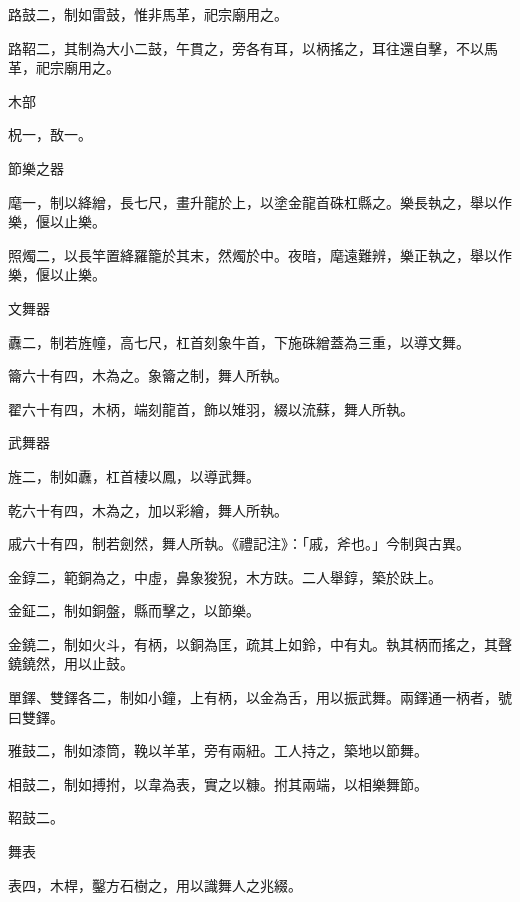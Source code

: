 \begin{pinyinscope}
 路鼓二，制如雷鼓，惟非馬革，祀宗廟用之。



 路鞀二，其制為大小二鼓，午貫之，旁各有耳，以柄搖之，耳往還自擊，不以馬革，祀宗廟用之。



 木部



 柷一，敔一。



 節樂之器



 麾一，制以絳繒，長七尺，畫升龍於上，以塗金龍首硃杠縣之。樂長執之，舉以作樂，偃以止樂。



 照燭二，以長竿置絳羅籠於其末，然燭於中。夜暗，麾遠難辨，樂正執之，舉以作樂，偃以止樂。



 文舞器



 纛二，制若旌幢，高七尺，杠首刻象牛首，下施硃繒蓋為三重，以導文舞。



 籥六十有四，木為之。象籥之制，舞人所執。



 翟六十有四，木柄，端刻龍首，飾以雉羽，綴以流蘇，舞人所執。



 武舞器



 旌二，制如纛，杠首棲以鳳，以導武舞。



 乾六十有四，木為之，加以彩繪，舞人所執。



 戚六十有四，制若劍然，舞人所執。《禮記注》：「戚，斧也。」今制與古異。



 金錞二，範銅為之，中虛，鼻象狻猊，木方趺。二人舉錞，築於趺上。



 金鉦二，制如銅盤，縣而擊之，以節樂。



 金鐃二，制如火斗，有柄，以銅為匡，疏其上如鈴，中有丸。執其柄而搖之，其聲鐃鐃然，用以止鼓。



 單鐸、雙鐸各二，制如小鐘，上有柄，以金為舌，用以振武舞。兩鐸通一柄者，號曰雙鐸。



 雅鼓二，制如漆筒，鞔以羊革，旁有兩紐。工人持之，築地以節舞。



 相鼓二，制如搏拊，以韋為表，實之以糠。拊其兩端，以相樂舞節。



 鞀鼓二。



 舞表



 表四，木桿，鑿方石樹之，用以識舞人之兆綴。



\end{pinyinscope}